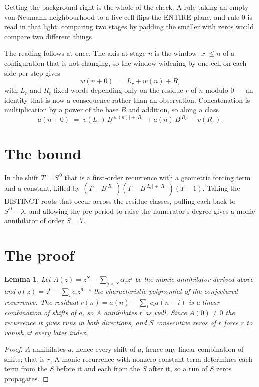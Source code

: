 \documentclass[11pt,a4paper]{article}
\theoremstyle{plain}
\newtheorem{lemma}[theorem]{Lemma}
\theoremstyle{definition}
\begin{document}
Getting the background right is the whole of the check. A rule taking an empty von Neumann
neighbourhood to a live cell flips the ENTIRE plane, and rule 0 is read
in that light: comparing two stages by padding the smaller with zeros would compare two
different things.

The reading follows at once. The axis at stage $n$ is the window $|x|\le n$ of a configuration
that is not changing, so the window widening by one cell on each side per step gives
\[
w(n+0)\;=\;L_r + w(n) + R_r
\]
with $L_r$ and $R_r$ fixed words depending only on the residue $r$ of $n$ modulo $0$ --- an
identity that is now a consequence rather than an observation. Concatenation is multiplication
by a power of the base $B$ and addition, so along a class
\[
a(n+0)\;=\;v(L_r)\,B^{|w(n)|+|R_r|} + a(n)\,B^{|R_r|} + v(R_r).
\]

\section{The bound}

In the shift $T=S^{\,0}$ that is a first-order recurrence with a geometric forcing term and a
constant, killed by $(T-B^{|R_r|})(T-B^{|L_r|+|R_r|})(T-1)$. Taking the DISTINCT roots that
occur across the residue classes, pulling each back to $S^{\,0}-\lambda$, and allowing the
pre-period to raise the numerator's degree gives a monic annihilator of order $S=7$.

\section{The proof}

\begin{lemma}\label{lem:crit}
Let $A(z)=z^S-\sum_{j<S}\alpha_jz^{j}$ be the monic annihilator derived above and
$q(z)=z^{6}-\sum_ic_iz^{6-i}$ the characteristic polynomial of the conjectured
recurrence. The residual $r(n)=a(n)-\sum_ic_ia(n-i)$ is a linear combination of shifts of $a$,
so $A$ annihilates $r$ as well. Since $A(0)\ne0$ the recurrence it gives runs in both
directions, and $S$ consecutive zeros of $r$ force $r$ to vanish at every later index.
\end{lemma}

\begin{proof}
$A$ annihilates $a$, hence every shift of $a$, hence any linear combination of shifts; that is
$r$. A monic recurrence with nonzero constant term determines each term from the $S$ before it
and each from the $S$ after it, so a run of $S$ zeros propagates.
\end{proof}
\end{document}
